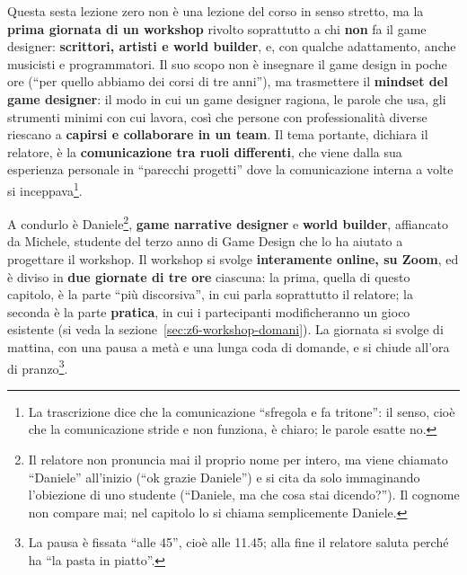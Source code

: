 Questa sesta lezione zero non è una lezione del corso in senso stretto, ma la
\textbf{prima giornata di un workshop} rivolto soprattutto a chi \textbf{non} fa
il game designer: \textbf{scrittori, artisti e world builder}, e, con qualche
adattamento, anche musicisti e programmatori. Il suo scopo non è insegnare il
game design in poche ore (``per quello abbiamo dei corsi di tre anni''), ma
trasmettere il \textbf{mindset del game designer}: il modo in cui un game
designer ragiona, le parole che usa, gli strumenti minimi con cui lavora, così
che persone con professionalità diverse riescano a \textbf{capirsi e collaborare
in un team}. Il tema portante, dichiara il relatore, è la \textbf{comunicazione
tra ruoli differenti}, che viene dalla sua esperienza personale in ``parecchi
progetti'' dove la comunicazione interna a volte si inceppava\footnote{La
trascrizione dice che la comunicazione ``sfregola e fa tritone'': il senso,
cioè che la comunicazione stride e non funziona, è chiaro; le parole esatte no.}.

A condurlo è Daniele\footnote{Il relatore non pronuncia mai il proprio nome
per intero, ma viene chiamato ``Daniele'' all'inizio (``ok grazie Daniele'') e
si cita da solo immaginando l'obiezione di uno studente (``Daniele, ma che cosa
stai dicendo?''). Il cognome non compare mai; nel capitolo lo si chiama
semplicemente Daniele.}, \textbf{game narrative designer} e \textbf{world
builder}, affiancato da Michele, studente del terzo anno di Game Design che lo
ha aiutato a progettare il workshop. Il workshop si svolge \textbf{interamente
online, su Zoom}, ed è diviso in \textbf{due giornate di tre ore} ciascuna: la
prima, quella di questo capitolo, è la parte ``più discorsiva'', in cui parla
soprattutto il relatore; la seconda è la parte \textbf{pratica}, in cui i
partecipanti modificheranno un gioco esistente (si veda la
sezione~\ref{sec:z6-workshop-domani}). La giornata si svolge di mattina, con
una pausa a metà e una lunga coda di domande, e si chiude all'ora di
pranzo\footnote{La pausa è fissata ``alle 45'', cioè alle 11.45; alla fine il
relatore saluta perché ha ``la pasta in piatto''.}.

